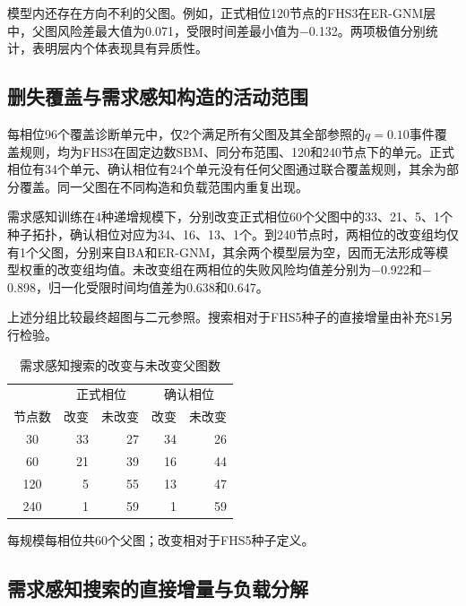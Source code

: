 \documentclass[UTF8,a4paper,twocolumn,fontset=none,zihao=5]{ctexart}
\begin{document}
模型内还存在方向不利的父图。例如，正式相位120节点的FHS3在ER-GNM层中，父图风险差最大值为0.071，受限时间差最小值为$-$0.132。两项极值分别统计，表明层内个体表现具有异质性。




\subsection{删失覆盖与需求感知构造的活动范围}

每相位96个覆盖诊断单元中，仅2个满足所有父图及其全部参照的$q=0.10$事件覆盖规则，均为FHS3在固定边数SBM、同分布范围、120和240节点下的单元。正式相位有34个单元、确认相位有24个单元没有任何父图通过联合覆盖规则，其余为部分覆盖。同一父图在不同构造和负载范围内重复出现。


需求感知训练在4种递增规模下，分别改变正式相位60个父图中的33、21、5、1个种子拓扑，确认相位对应为34、16、13、1个。到240节点时，两相位的改变组均仅有1个父图，分别来自BA和ER-GNM，其余两个模型层为空，因而无法形成等模型权重的改变组均值。未改变组在两相位的失败风险均值差分别为$-$0.922和$-$0.898，归一化受限时间均值差为0.638和0.647。


上述分组比较最终超图与二元参照。搜索相对于FHS5种子的直接增量由补充S1另行检验。


\begin{table}[t]\centering
\caption{需求感知搜索的改变与未改变父图数}\label{tab:3}
\small\begin{tabular*}{\columnwidth}{@{\extracolsep{\fill}}crrrr}\toprule
&\multicolumn{2}{c}{正式相位}&\multicolumn{2}{c}{确认相位}\\
节点数&改变&未改变&改变&未改变\\\midrule
30 & 33 & 27 & 34 & 26\\
60 & 21 & 39 & 16 & 44\\
120 & 5 & 55 & 13 & 47\\
240 & 1 & 59 & 1 & 59\\
\bottomrule\end{tabular*}
\par\smallskip\footnotesize 每规模每相位共60个父图；改变相对于FHS5种子定义。
\end{table}





\subsection{需求感知搜索的直接增量与负载分解}
\end{document}
